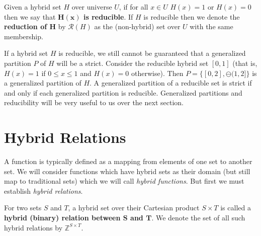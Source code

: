 \begin{definition}
	Given a hybrid set $H$ over universe $U$, 
	if for all $x \in U$ $H(x)=1$ or $H(x)=0$ then we say that \textbf{$\boldsymbol{H(x)}$ is reducible}.
	If $H$ is reducible then we denote the \textbf{reduction of $\boldsymbol{H}$} by $\mathcal{R}(H)$ 
	as the (non-hybrid) set over $U$ with the same membership.  
\end{definition}


If a hybrid set $H$ is reducible, we still cannot be guaranteed that a generalized partition $P$ of $H$ will be a strict.
Consider the reducible hybrid set $[0,1]$ (that is, $H(x)=1$ if $0 \leq x \leq 1$ and $H(x)=0$ otherwise).
Then $P = \big\{ [0,2], \ominus (1,2] \big\}$ is a generalized partition of $H$. 
A generalized partition of a reducible set is strict if and only if each generalized partition is reducible.
Generalized partitions and reducibility will be very useful to us over the next section.




%
%
\section{Hybrid Relations}


A function is typically defined as a mapping from elements of one set to another set.
We will consider functions which have hybrid sets as their domain (but still map to traditional sets) 
which we will call \emph{hybrid functions}.
But first we must establish \emph{hybrid relations}.

\begin{definition}
	For two sets $S$ and $T$, a hybrid set over their Cartesian product $S \times T$ is called a 
	\textbf{hybrid (binary) relation between $\boldsymbol{S}$ and $\boldsymbol{T}$}.
	We denote the set of all such hybrid relations by $\mathbb{Z}^{S \times T}$. 
\end{definition}


